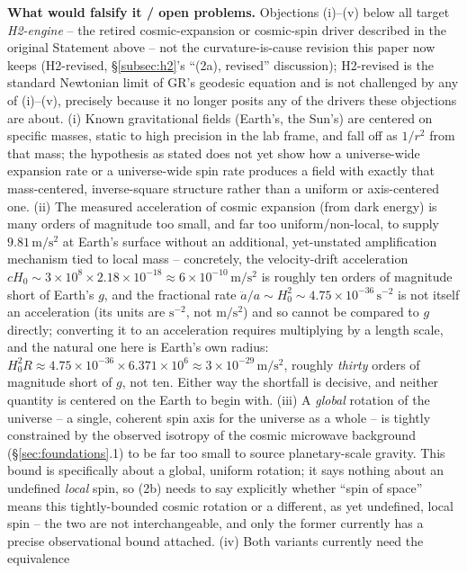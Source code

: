 \documentclass[12pt, a4paper]{article}
\begin{document}
\textbf{What would falsify it / open problems.} Objections (i)--(v)
below all target \emph{H2-engine} -- the retired cosmic-expansion or
cosmic-spin driver described in the original Statement above -- not
the curvature-is-cause revision this paper now keeps (H2-revised,
\S\ref{subsec:h2}'s ``(2a), revised'' discussion); H2-revised is the
standard Newtonian limit of GR's geodesic equation and is not
challenged by any of (i)--(v), precisely because it no longer posits
any of the drivers these objections are about.
(i) Known gravitational fields (Earth's, the Sun's) are centered on
specific masses, static to high precision in the lab frame, and fall
off as $1/r^2$ from that mass; the hypothesis as stated does not yet
show how a universe-wide expansion rate or a universe-wide spin rate
produces a field with exactly that mass-centered, inverse-square
structure rather than a uniform or axis-centered one. (ii) The
measured acceleration of cosmic expansion (from dark energy) is many
orders of magnitude too small, and far too uniform/non-local, to
supply $9.81\,\mathrm{m/s^2}$ at Earth's surface without an additional,
yet-unstated amplification mechanism tied to local mass -- concretely,
the velocity-drift acceleration $cH_0\sim3\times10^8\times2.18\times10^{-18}
\approx6\times10^{-10}\,\mathrm{m/s^2}$ is roughly ten orders of
magnitude short of Earth's $g$, and the fractional rate $\ddot
a/a\sim H_0^2\sim4.75\times10^{-36}\,\mathrm{s^{-2}}$ is not itself an
acceleration (its units are $\mathrm{s^{-2}}$, not $\mathrm{m/s^2}$)
and so cannot be compared to $g$ directly; converting it to an
acceleration requires multiplying by a length scale, and the natural
one here is Earth's own radius: $H_0^2 R\approx4.75\times10^{-36}
\times6.371\times10^6\approx3\times10^{-29}\,\mathrm{m/s^2}$, roughly
\emph{thirty} orders of magnitude short of $g$, not ten. Either way
the shortfall is decisive, and neither quantity is centered on the
Earth to begin with. (iii) A
\emph{global} rotation of the universe -- a single, coherent spin
axis for the universe as a whole -- is tightly constrained by the
observed isotropy of the cosmic microwave background
(\S\ref{sec:foundations}.1) to be far too small to source
planetary-scale gravity. This bound is specifically about a global,
uniform rotation; it says nothing about an undefined \emph{local}
spin, so (2b) needs to say explicitly whether ``spin of space'' means
this tightly-bounded cosmic rotation or a different, as yet
undefined, local spin -- the two are not interchangeable, and only
the former currently has a precise observational bound attached. (iv) Both variants currently need the equivalence
\end{document}
